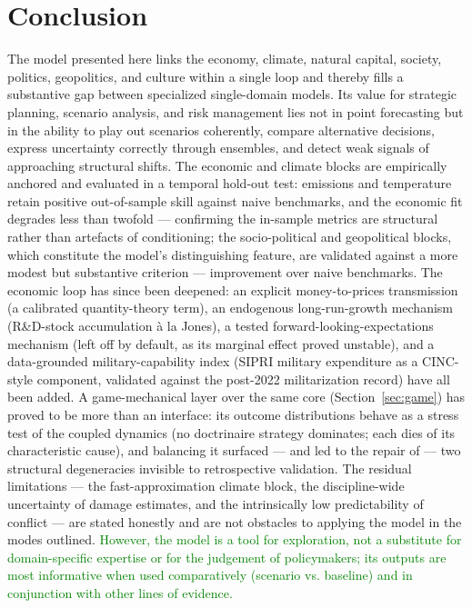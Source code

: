 \documentclass[a4paper,fleqn]{cas-sc}
\begin{document}
\section{Conclusion}

The model presented here links the economy, climate, natural capital, society, politics, geopolitics,
and culture within a single loop and thereby fills a substantive gap between specialized
single-domain models. Its value for strategic planning, scenario analysis, and risk management lies
not in point forecasting but in the ability to play out scenarios coherently, compare alternative
decisions, express uncertainty correctly through ensembles, and detect weak signals of approaching
structural shifts. The economic and climate blocks are empirically anchored and evaluated in a temporal
hold-out test: emissions and temperature retain positive out-of-sample skill against naive
benchmarks, and the economic fit degrades less than twofold --- confirming the in-sample
metrics are structural rather than artefacts of conditioning; the socio-political and geopolitical blocks, which constitute the model's distinguishing
feature, are validated against a more modest but substantive criterion --- improvement over naive
benchmarks. The economic loop has since been deepened: an explicit money-to-prices transmission (a calibrated
quantity-theory term), an endogenous long-run-growth mechanism (R\&D-stock accumulation à la Jones),
a tested forward-looking-expectations mechanism (left off by default, as its marginal effect proved
unstable), and a data-grounded military-capability index (SIPRI military expenditure as a
CINC-style component, validated against the post-2022 militarization record) have all been added. A game-mechanical layer over the same core (Section~\ref{sec:game}) has proved to be more than an
interface: its outcome distributions behave as a stress test of the coupled dynamics (no
doctrinaire strategy dominates; each dies of its characteristic cause), and balancing it surfaced
--- and led to the repair of --- two structural degeneracies invisible to retrospective
validation. The residual limitations --- the fast-approximation climate block, the
discipline-wide uncertainty of damage estimates, and the intrinsically low predictability of conflict
--- are stated honestly and are not obstacles to applying the model in the modes outlined. \textcolor{green}{However, the model is a tool for exploration, not a substitute for domain-specific expertise or for the judgement of policymakers; its outputs are most informative when used comparatively (scenario vs. baseline) and in conjunction with other lines of evidence.}
\end{document}
